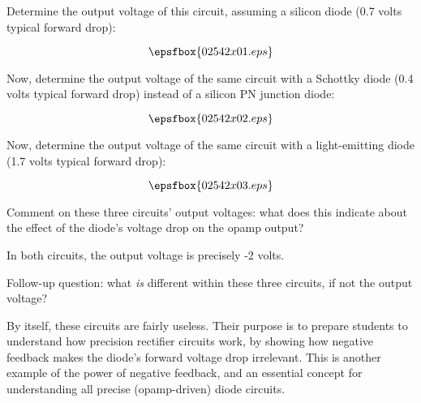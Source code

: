 

Determine the output voltage of this circuit, assuming a silicon diode (0.7 volts typical forward drop):

$$\epsfbox{02542x01.eps}$$

Now, determine the output voltage of the same circuit with a Schottky diode (0.4 volts typical forward drop) instead of a silicon PN junction diode:

$$\epsfbox{02542x02.eps}$$

Now, determine the output voltage of the same circuit with a light-emitting diode (1.7 volts typical forward drop):

$$\epsfbox{02542x03.eps}$$

Comment on these three circuits' output voltages: what does this indicate about the effect of the diode's voltage drop on the opamp output?  







In both circuits, the output voltage is precisely -2 volts.

\vskip 10pt

Follow-up question: what {\it is} different within these three circuits, if not the output voltage?







By itself, these circuits are fairly useless.  Their purpose is to prepare students to understand how precision rectifier circuits work, by showing how negative feedback makes the diode's forward voltage drop irrelevant.  This is another example of the power of negative feedback, and an essential concept for understanding all precise (opamp-driven) diode circuits.





